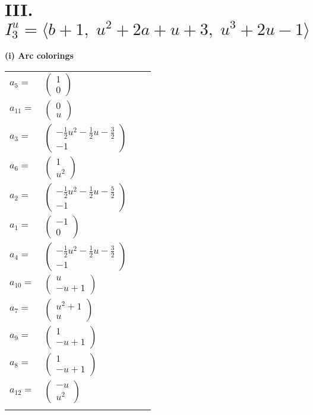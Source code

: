 \documentclass[1p]{elsarticle_modified}
\theoremstyle{definition}
\begin{document}
\centering \section*{III. $I^u_{3}= \langle b+1,\;u^2+2 a+u+3,\;u^3+2 u-1 \rangle$}
\flushleft \textbf{(i) Arc colorings}\\
\begin{tabular}{m{7pt} m{180pt} m{7pt} m{180pt} }
\flushright $a_{5}=$&$\begin{pmatrix}1\\0\end{pmatrix}$ \\
\flushright $a_{11}=$&$\begin{pmatrix}0\\u\end{pmatrix}$ \\
\flushright $a_{3}=$&$\begin{pmatrix}-\frac{1}{2} u^2-\frac{1}{2} u-\frac{3}{2}\\-1\end{pmatrix}$ \\
\flushright $a_{6}=$&$\begin{pmatrix}1\\u^2\end{pmatrix}$ \\
\flushright $a_{2}=$&$\begin{pmatrix}-\frac{1}{2} u^2-\frac{1}{2} u-\frac{5}{2}\\-1\end{pmatrix}$ \\
\flushright $a_{1}=$&$\begin{pmatrix}-1\\0\end{pmatrix}$ \\
\flushright $a_{4}=$&$\begin{pmatrix}-\frac{1}{2} u^2-\frac{1}{2} u-\frac{3}{2}\\-1\end{pmatrix}$ \\
\flushright $a_{10}=$&$\begin{pmatrix}u\\- u+1\end{pmatrix}$ \\
\flushright $a_{7}=$&$\begin{pmatrix}u^2+1\\u\end{pmatrix}$ \\
\flushright $a_{9}=$&$\begin{pmatrix}1\\- u+1\end{pmatrix}$ \\
\flushright $a_{8}=$&$\begin{pmatrix}1\\- u+1\end{pmatrix}$ \\
\flushright $a_{12}=$&$\begin{pmatrix}- u\\u^2\end{pmatrix}$\\&\end{tabular}
\end{document}
